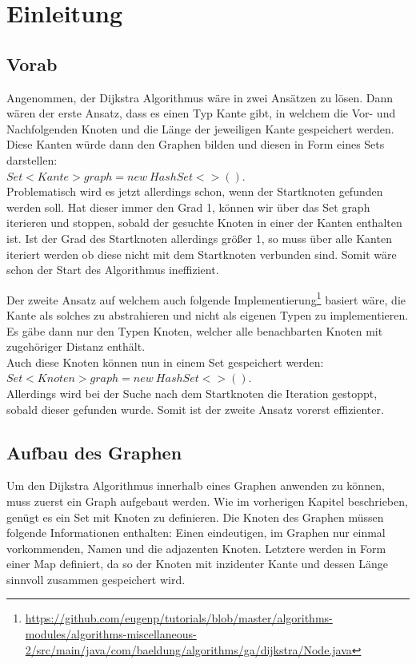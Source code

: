 \documentclass[a4paper]{article}
\begin{document}
	

\newpage

\section{Einleitung}

\subsection{Vorab}

Angenommen, der Dijkstra Algorithmus wäre in zwei Ansätzen zu lösen. Dann wären der erste Ansatz, dass es einen Typ Kante gibt, in welchem die Vor- und Nachfolgenden Knoten und die Länge der jeweiligen Kante gespeichert werden.\\
Diese Kanten würde dann den Graphen bilden und diesen in Form eines Sets darstellen:\\$Set <Kante> graph = new\ HashSet<>()$.\\
Problematisch wird es jetzt allerdings schon, wenn der Startknoten gefunden werden soll. Hat dieser immer den Grad 1, können wir über das Set graph iterieren und stoppen, sobald der gesuchte Knoten in einer der Kanten enthalten ist. Ist der Grad des Startknoten allerdings größer 1, so muss über alle Kanten iteriert werden ob diese nicht mit dem Startknoten verbunden sind. Somit wäre schon der Start des Algorithmus ineffizient.

Der zweite Ansatz auf welchem auch folgende Implementierung\footnote{\url{https://github.com/eugenp/tutorials/blob/master/algorithms-modules/algorithms-miscellaneous-2/src/main/java/com/baeldung/algorithms/ga/dijkstra/Node.java}} basiert wäre, die Kante als solches zu abstrahieren und nicht als eigenen Typen zu implementieren. Es gäbe dann nur den Typen Knoten, welcher alle benachbarten Knoten mit zugehöriger Distanz enthält.\\
Auch diese Knoten können nun in einem Set gespeichert werden:\\
$Set<Knoten> graph = new\ HashSet<>()$.\\
Allerdings wird bei der Suche nach dem Startknoten die Iteration gestoppt, sobald dieser gefunden wurde.
Somit ist der zweite Ansatz vorerst effizienter.

\subsection{Aufbau des Graphen}

Um den Dijkstra Algorithmus innerhalb eines Graphen anwenden zu können, muss zuerst ein Graph aufgebaut werden.
Wie im vorherigen Kapitel beschrieben, genügt es ein Set mit Knoten zu definieren.
Die Knoten des Graphen müssen folgende Informationen enthalten: Einen eindeutigen, im Graphen nur einmal vorkommenden, Namen und die adjazenten Knoten. Letztere werden in Form einer Map definiert, da so der Knoten mit inzidenter Kante und dessen Länge sinnvoll zusammen gespeichert wird.
\end{document}
